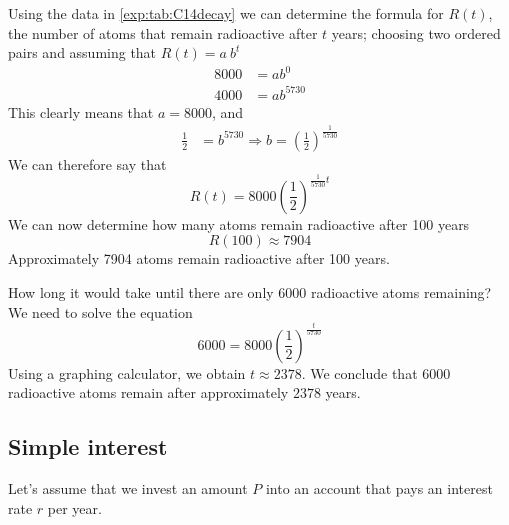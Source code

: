 \begin{pccexample}
	Using the data in \cref{exp:tab:C14decay} we can determine the formula for $R(t)$, 
	the number of atoms that remain radioactive after $t$ years; choosing 
	two ordered pairs and assuming that $R(t)=a\ b^t$
	\begin{align*}
		8000 & = ab^0     \\
		4000 & =ab^{5730} 
	\end{align*}
	This clearly means that $a=8000$, and 
	\begin{align*}
		\frac{1}{2} & = b^{5730} \Longrightarrow b = \left( \frac{1}{2} \right)^{\frac{1}{5730}} 
	\end{align*}
	We can therefore say that
	\[
		R(t)=8000\left(\frac12\right)^{\frac1{5730}t}
	\]
	We can now determine how many atoms remain radioactive after 100 years
	\[
		R(100)\approx 7904
	\] 
	Approximately 7904 atoms remain radioactive after 100 years.
										
	How long it would take until there are only 6000 radioactive atoms remaining?
	We need to solve the equation 
	\[
		6000=8000\left( \frac{1}{2} \right)^{\frac{t}{5730}}
	\]
	Using a graphing calculator, we obtain 
	$t\approx 2378$. We conclude that 6000 radioactive atoms remain after approximately $2378$ years.
\end{pccexample}
			
\subsection*{Simple interest}
Let's assume that we invest an amount $P$ into an account that pays 
an interest rate $r$ per year.
			
